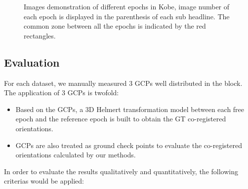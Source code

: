 \begin{figure}[htbp]
\begin{center}
{\begin{minipage}[t]{1\linewidth}
            \end{minipage}%
        }
        \caption{Images demonstration of different epochs in Kobe, image number of each epoch is displayed in the parenthesis of each sub headline. The common zone between all the epochs is indicated by the red rectangles.}
        \label{KobeData}
    \end{center}
\end{figure} 

\subsection{Evaluation}
For each dataset, we manually measured 3 GCPs well distributed in the block. The application of 3 GCPs is twofold:\\
\begin{itemize}
    \item Based on the GCPs, a 3D Helmert transformation model between each free epoch and the reference epoch is built to obtain the GT co-registered orientations.
    \item GCPs are also treated as ground check points to evaluate the co-registered orientations calculated by our methods.
\end{itemize}
In order to evaluate the results qualitatively and quantitatively, the following criterias would be applied:\\

